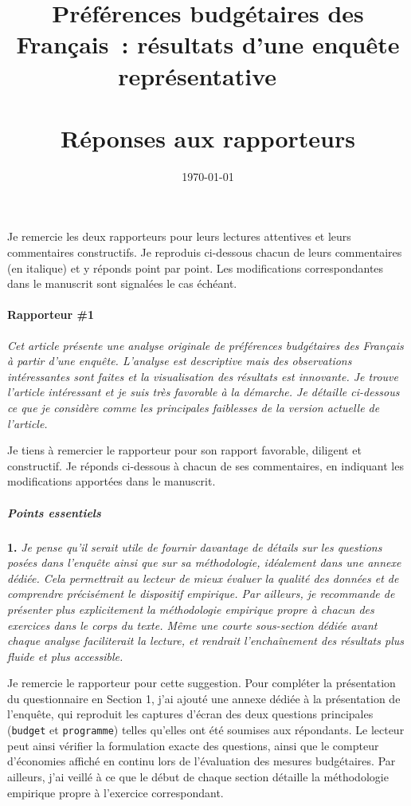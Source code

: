 \documentclass[12pt,french]{article}
\title{Préférences budgétaires des Français~: résultats d'une enquête représentative ~\\ ~\\ \textbf{Réponses aux rapporteurs}}
\date{\today}
\begin{document}
\maketitle

\noindent Je remercie les deux rapporteurs pour leurs lectures attentives et leurs commentaires constructifs. Je reproduis ci-dessous chacun de leurs commentaires (en italique) et y réponds point par point. Les modifications correspondantes dans le manuscrit sont signalées le cas échéant.

\bigskip

\paragraph*{Rapporteur \#1}

\textit{Cet article présente une analyse originale de préférences budgétaires des Français à partir d'une enquête. L'analyse est descriptive mais des observations intéressantes sont faites et la visualisation des résultats est innovante. Je trouve l'article intéressant et je suis très favorable à la démarche. Je détaille ci-dessous ce que je considère comme les principales faiblesses de la version actuelle de l'article.}

Je tiens à remercier le rapporteur pour son rapport favorable, diligent et constructif. Je réponds ci-dessous à chacun de ses commentaires, en indiquant les modifications apportées dans le manuscrit.

\subparagraph*{Points essentiels}

\bigskip
\noindent\textbf{1.} \textit{Je pense qu'il serait utile de fournir davantage de détails sur les questions posées dans l'enquête ainsi que sur sa méthodologie, idéalement dans une annexe dédiée. Cela permettrait au lecteur de mieux évaluer la qualité des données et de comprendre précisément le dispositif empirique. Par ailleurs, je recommande de présenter plus explicitement la méthodologie empirique propre à chacun des exercices dans le corps du texte. Même une courte sous-section dédiée avant chaque analyse faciliterait la lecture, et rendrait l'enchaînement des résultats plus fluide et plus accessible.}

Je remercie le rapporteur pour cette suggestion. Pour compléter la présentation du questionnaire en Section 1, j'ai ajouté une annexe dédiée à la présentation de l'enquête, qui reproduit les captures d'écran des deux questions principales (\texttt{budget} et \texttt{programme}) telles qu'elles ont été soumises aux répondants. Le lecteur peut ainsi vérifier la formulation exacte des questions, ainsi que le compteur d'économies affiché en continu lors de l'évaluation des mesures budgétaires. Par ailleurs, j'ai veillé à ce que le début de chaque section détaille la méthodologie empirique propre à l'exercice correspondant.
\end{document}
